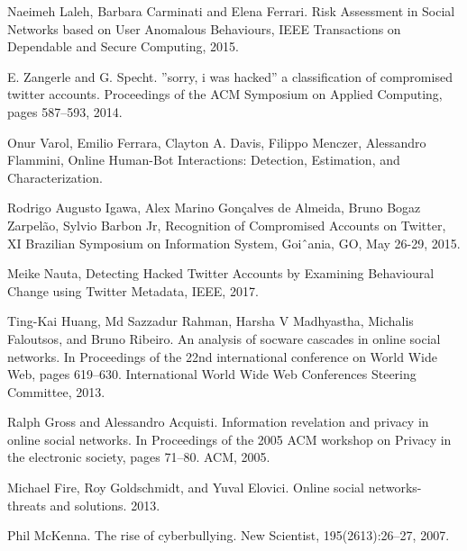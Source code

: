 \documentclass[conference]{IEEEtran}
\begin{document}
\begin{enumerate}[label={[\arabic*]}]
\item  Naeimeh Laleh, Barbara Carminati and Elena Ferrari. Risk Assessment in Social Networks based on
User Anomalous Behaviours, IEEE Transactions on Dependable and Secure Computing, 2015.

\item E. Zangerle and G. Specht. ”sorry, i was hacked” a
classification of compromised twitter accounts.
Proceedings of the ACM Symposium on Applied
Computing, pages 587–593, 2014.
\item Onur Varol, Emilio Ferrara, Clayton A. Davis, Filippo Menczer, Alessandro Flammini, Online Human-Bot Interactions: Detection, Estimation, and Characterization.
\item Rodrigo Augusto Igawa, Alex Marino Gonçalves de Almeida, Bruno Bogaz Zarpelão, Sylvio Barbon Jr, Recognition of Compromised Accounts on Twitter, XI Brazilian Symposium on Information System, Goiˆania, GO, May 26-29, 2015.
\item Meike Nauta, Detecting Hacked Twitter Accounts by Examining
Behavioural Change using Twitter Metadata, IEEE, 2017.
\item Ting-Kai Huang, Md Sazzadur Rahman, Harsha V
Madhyastha, Michalis Faloutsos, and Bruno Ribeiro. An
analysis of socware cascades in online social networks.
In Proceedings of the 22nd international conference on
World Wide Web, pages 619–630. International World
Wide Web Conferences Steering Committee, 2013.
\item Ralph Gross and Alessandro Acquisti. Information
revelation and privacy in online social networks. In
Proceedings of the 2005 ACM workshop on Privacy in
the electronic society, pages 71–80. ACM, 2005.
\item Michael Fire, Roy Goldschmidt, and Yuval Elovici.
Online social networks- threats and solutions. 2013.
\item Phil McKenna. The rise of cyberbullying. New
Scientist, 195(2613):26–27, 2007.


\end{enumerate}
\end{document}
